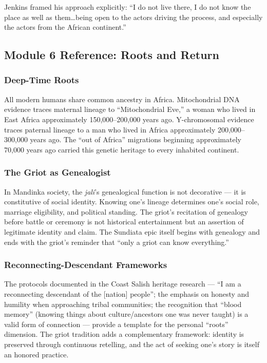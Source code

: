 \documentclass[11pt,letterpaper]{article}
\begin{document}
Jenkins framed his approach explicitly: ``I do not live there, I do not know the place as well as them\ldots being open to the actors driving the process, and especially the actors from the African continent.''

\subsection{Module 6 Reference: Roots and Return}

\subsubsection{Deep-Time Roots}

All modern humans share common ancestry in Africa. Mitochondrial DNA evidence traces maternal lineage to ``Mitochondrial Eve,'' a woman who lived in East Africa approximately 150,000--200,000 years ago. Y-chromosomal evidence traces paternal lineage to a man who lived in Africa approximately 200,000--300,000 years ago. The ``out of Africa'' migrations beginning approximately 70,000 years ago carried this genetic heritage to every inhabited continent.

\subsubsection{The Griot as Genealogist}

In Mandinka society, the \textit{jali}'s genealogical function is not decorative --- it is constitutive of social identity. Knowing one's lineage determines one's social role, marriage eligibility, and political standing. The griot's recitation of genealogy before battle or ceremony is not historical entertainment but an assertion of legitimate identity and claim. The Sundiata epic itself begins with genealogy and ends with the griot's reminder that ``only a griot can know everything.''

\subsubsection{Reconnecting-Descendant Frameworks}

The protocols documented in the Coast Salish heritage research --- ``I am a reconnecting descendant of the [nation] people''; the emphasis on honesty and humility when approaching tribal communities; the recognition that ``blood memory'' (knowing things about culture/ancestors one was never taught) is a valid form of connection --- provide a template for the personal ``roots'' dimension. The griot tradition adds a complementary framework: identity is preserved through continuous retelling, and the act of seeking one's story is itself an honored practice.
\end{document}
